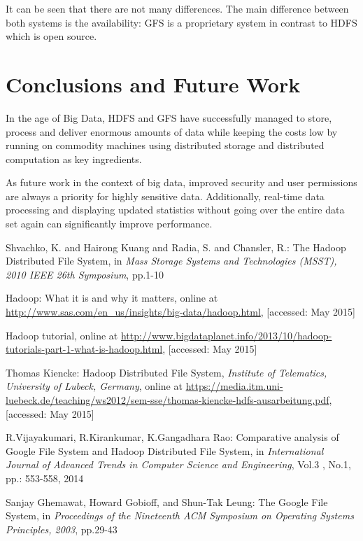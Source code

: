 \documentclass{sig-alternate}
\begin{document}
It can be seen that there are not many differences. The main difference between both systems is the availability: GFS is a proprietary system in contrast to HDFS which is open source.

\section{Conclusions and Future Work}
In the age of Big Data, HDFS and GFS have successfully managed to store, process and deliver enormous amounts of data while keeping the costs low by running on commodity machines using distributed storage and distributed computation as key ingredients. 

As future work in the context of big data, improved security and user permissions are always a priority for highly sensitive data. Additionally, real-time data processing and displaying updated statistics without going over the entire data set again can significantly improve performance.




%


\begin{thebibliography}{4}

 Shvachko, K. and Hairong Kuang and Radia, S. and Chansler, R.: The Hadoop Distributed File System, in
\textit{Mass Storage Systems and Technologies (MSST), 2010 IEEE 26th Symposium}, pp.1-10

 Hadoop: What it is and why it matters, online at
\url{http://www.sas.com/en_us/insights/big-data/hadoop.html}, [accessed: May 2015]

 Hadoop tutorial, online at
\url{http://www.bigdataplanet.info/2013/10/hadoop-tutorials-part-1-what-is-hadoop.html}, [accessed: May 2015]

 Thomas Kiencke: Hadoop Distributed File System,
\textit{Institute of Telematics, University of Lubeck, Germany},
 online at
\url{https://media.itm.uni-luebeck.de/teaching/ws2012/sem-sse/thomas-kiencke-hdfs-ausarbeitung.pdf}, [accessed: May 2015]

 R.Vijayakumari, R.Kirankumar, K.Gangadhara Rao: Comparative analysis of Google File System and Hadoop Distributed File System, in \textit{International Journal of Advanced Trends in Computer Science and Engineering}, Vol.3 , No.1, pp.: 553-558, 2014

 Sanjay Ghemawat, Howard Gobioff, and Shun-Tak Leung: The Google File System, in
\textit{Proceedings of the Nineteenth ACM Symposium on Operating Systems Principles, 2003}, pp.29-43

\end{thebibliography}  


\balancecolumns
\end{document}
